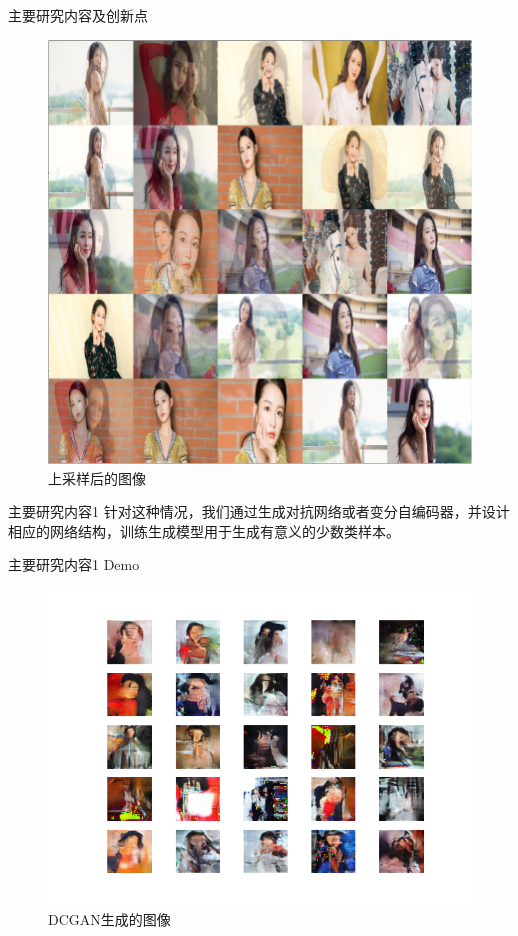 \documentclass{beamer}
\begin{document}
\begin{frame}{主要研究内容及创新点}\pause
    \begin{figure}[t]
        \includegraphics[scale=0.25]{liSMOTE2.png}
        \caption{上采样后的图像}
    \end{figure}
\end{frame}

\begin{frame}{主要研究内容1}\pause
    针对这种情况，我们通过生成对抗网络或者变分自编码器，并设计相应的网络结构，训练生成模型用于生成有意义的少数类样本。
\end{frame}


\begin{frame}{主要研究内容1 Demo}\pause
    \begin{figure}[htbp]
        \centering    %
        \includegraphics[scale=0.4]{generate1.png}
        \caption{DCGAN生成的图像}
    \end{figure}
   

\end{frame}
\end{document}
